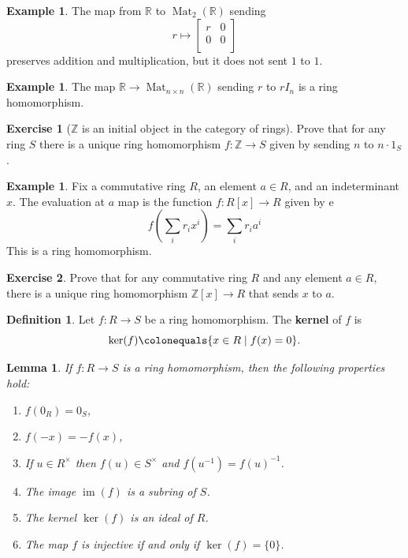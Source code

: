 \documentclass[12pt]{report}
\newtheorem{lemma}[theorem]{Lemma}
\numberwithin{equation}{section}
\numberwithin{theorem}{chapter}
\theoremstyle{definition}
\newtheorem{definition}[theorem]{Definition}
\newtheorem{example}[theorem]{Example}
\newtheorem{exercise}{Exercise}
\newtheorem*{basic properties}{Basic Properties}
\newtheorem*{Important Remark}{Important Remark}
\newcommand{\df}[1]{{\bf #1}\index{#1}}
\newcommand{\R}{\mathbb{R}}
\newcommand{\Z}{\mathbb{Z}}
\renewcommand{\ker}{\operatorname{ker}}
\DeclareMathOperator{\im}{im}
\DeclareMathOperator{\Mat}{Mat}
\begin{document}
\begin{example} 
The map from $\R$ to $\Mat_{2}(\R)$ sending 
$$r \mapsto \begin{bmatrix} r & 0 \\0  & 0 \\ \end{bmatrix}$$
preserves addition and multiplication, but it does not sent $1$ to $1$.  	
\end{example}


  
\begin{example} 
The map $\R  \to \Mat_{n \times n}(\R)$ sending $r$ to $rI_n$ is a ring homomorphism. 	
\end{example}





\begin{exercise}[$\Z$ is an initial object in the category of rings] 
 Prove that for any ring $S$ there is a unique ring homomorphism $f: \Z \to S$ given by sending $n$ to $n \cdot 1_S$. 	
\end{exercise}
  
  
\begin{example} 
Fix a commutative ring $R$, an element $a \in R$, and an indeterminant $x$. The evaluation at $a$ map is the function $f\!: R[x] \to R$ given by e
    $$f \left( \sum_i r_i x^i \right) = \sum_i r_i a^i$$ 
    This is a ring homomorphism.
\end{example}
  

\begin{exercise} 
Prove that for any commutative ring $R$ and any element $a \in R$, there is a unique ring homomorphism $\Z[x] \to R$ that sends $x$ to $a$.   	
\end{exercise}


\begin{definition}
	Let $f\!: R \longrightarrow S$ be a ring homomorphism. The \df{kernel} of $f$ is
	$$\ker(f) \colonequals \{ x \in R \mid f(x) = 0 \}.$$
\end{definition}


\begin{lemma}\label{ring hom properties}
If $f\!: R \to S$ is a ring homomorphism, then the following properties hold:
\begin{enumerate}[itemsep=0.1em]
\item $f(0_R) = 0_S$,
\item $f(-x)=-f(x)$, 
\item If $u\in R^\times$ then $f(u) \in S^\times$ and $f(u^{-1})=f(u)^{-1}$.
\item The image $\im(f)$ is a subring of $S$.
\item The kernel $\ker(f)$ is an ideal of $R$.
\item The map $f$ is injective if and only if $\ker(f) = \{0\}$. 
\end{enumerate}
\end{lemma}
\end{document}
